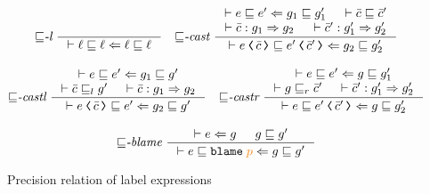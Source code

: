 \begin{figure}[tbp]
\raggedright
  {\small
  \begin{gather*}
    {\sqsubseteq}\textit{-l}~
    \inference{}{\vdash \ell \sqsubseteq \ell \Leftarrow \ell \sqsubseteq \ell}
    \quad
    {\sqsubseteq}\textit{-cast}~
    \inference{\vdash e \sqsubseteq e' \Leftarrow g_1 \sqsubseteq g_1' &
      \vdash \bar{c} \sqsubseteq \bar{c}' \\
      \vdash \bar{c} : g_1 \Rightarrow g_2 & \vdash \bar{c}' : g_1' \Rightarrow g_2'}
              {\vdash \cccast{e}{\bar{c}} \sqsubseteq \cccast{e'}{\bar{c}'} \Leftarrow g_2 \sqsubseteq g_2'}
    \\[2ex]
    {\sqsubseteq}\textit{-castl}~
    \inference{\vdash e \sqsubseteq e' \Leftarrow g_1 \sqsubseteq g' \\
               \vdash \bar{c} \sqsubseteq_l g' & \vdash \bar{c} : g_1 \Rightarrow g_2}
              {\vdash \cccast{e}{\bar{c}} \sqsubseteq e' \Leftarrow g_2 \sqsubseteq g'}
    \quad
    {\sqsubseteq}\textit{-castr}~
    \inference{\vdash e \sqsubseteq e' \Leftarrow g \sqsubseteq g_1' \\
               \vdash g \sqsubseteq_r \bar{c}' & \vdash \bar{c}' : g_1' \Rightarrow g_2'}
              {\vdash e \sqsubseteq \cccast{e'}{\bar{c}'} \Leftarrow g \sqsubseteq g_2'}
    \\[2ex]
    {\sqsubseteq}\textit{-blame}~
    \inference{\vdash e \Leftarrow g & g \sqsubseteq g'}
              {\vdash e \sqsubseteq \blame{p} \Leftarrow g \sqsubseteq g'}
  \end{gather*}}
  \caption{Precision relation of label expressions}
  \label{fig:lexpr-prec}
\end{figure}

